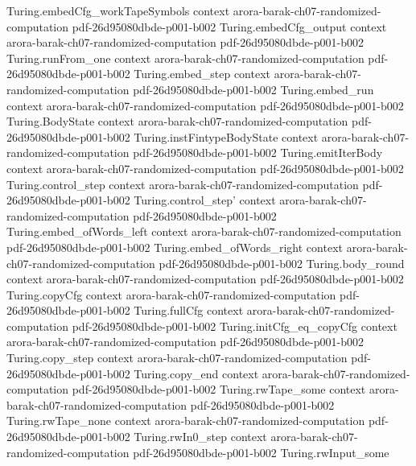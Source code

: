 \begin{theorem}
\proofstep
  {Turing.embedCfg_workTapeSymbols}
  {context}
  {arora-barak-ch07-randomized-computation}
  {pdf-26d95080dbde-p001-b002}
\proofstep
  {Turing.embedCfg_output}
  {context}
  {arora-barak-ch07-randomized-computation}
  {pdf-26d95080dbde-p001-b002}
\proofstep
  {Turing.runFrom_one}
  {context}
  {arora-barak-ch07-randomized-computation}
  {pdf-26d95080dbde-p001-b002}
\proofstep
  {Turing.embed_step}
  {context}
  {arora-barak-ch07-randomized-computation}
  {pdf-26d95080dbde-p001-b002}
\proofstep
  {Turing.embed_run}
  {context}
  {arora-barak-ch07-randomized-computation}
  {pdf-26d95080dbde-p001-b002}
\proofstep
  {Turing.BodyState}
  {context}
  {arora-barak-ch07-randomized-computation}
  {pdf-26d95080dbde-p001-b002}
\proofstep
  {Turing.instFintypeBodyState}
  {context}
  {arora-barak-ch07-randomized-computation}
  {pdf-26d95080dbde-p001-b002}
\proofstep
  {Turing.emitIterBody}
  {context}
  {arora-barak-ch07-randomized-computation}
  {pdf-26d95080dbde-p001-b002}
\proofstep
  {Turing.control_step}
  {context}
  {arora-barak-ch07-randomized-computation}
  {pdf-26d95080dbde-p001-b002}
\proofstep
  {Turing.control_step'}
  {context}
  {arora-barak-ch07-randomized-computation}
  {pdf-26d95080dbde-p001-b002}
\proofstep
  {Turing.embed_ofWords_left}
  {context}
  {arora-barak-ch07-randomized-computation}
  {pdf-26d95080dbde-p001-b002}
\proofstep
  {Turing.embed_ofWords_right}
  {context}
  {arora-barak-ch07-randomized-computation}
  {pdf-26d95080dbde-p001-b002}
\proofstep
  {Turing.body_round}
  {context}
  {arora-barak-ch07-randomized-computation}
  {pdf-26d95080dbde-p001-b002}
\proofstep
  {Turing.copyCfg}
  {context}
  {arora-barak-ch07-randomized-computation}
  {pdf-26d95080dbde-p001-b002}
\proofstep
  {Turing.fullCfg}
  {context}
  {arora-barak-ch07-randomized-computation}
  {pdf-26d95080dbde-p001-b002}
\proofstep
  {Turing.initCfg_eq_copyCfg}
  {context}
  {arora-barak-ch07-randomized-computation}
  {pdf-26d95080dbde-p001-b002}
\proofstep
  {Turing.copy_step}
  {context}
  {arora-barak-ch07-randomized-computation}
  {pdf-26d95080dbde-p001-b002}
\proofstep
  {Turing.copy_end}
  {context}
  {arora-barak-ch07-randomized-computation}
  {pdf-26d95080dbde-p001-b002}
\proofstep
  {Turing.rwTape_some}
  {context}
  {arora-barak-ch07-randomized-computation}
  {pdf-26d95080dbde-p001-b002}
\proofstep
  {Turing.rwTape_none}
  {context}
  {arora-barak-ch07-randomized-computation}
  {pdf-26d95080dbde-p001-b002}
\proofstep
  {Turing.rwIn0_step}
  {context}
  {arora-barak-ch07-randomized-computation}
  {pdf-26d95080dbde-p001-b002}
\proofstep
  {Turing.rwInput_some}

\end{theorem}

